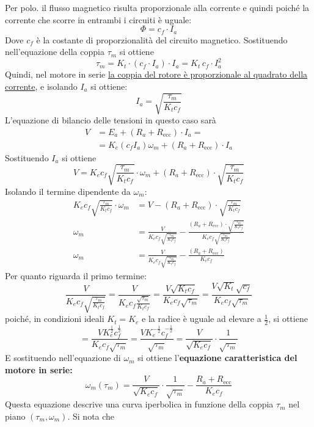﻿\documentclass[11pt, a4paper]{article}
\begin{document}
Per polo. il flusso magnetico risulta proporzionale alla corrente e quindi poiché la corrente che scorre in entrambi i circuiti è uguale:
\[
    \Phi = c_f \cdot I_a
\]
Dove $c_f$ è la costante di proporzionalità del circuito magnetico. Sostituendo nell'equazione della coppia $\tau_{m}$ si ottiene
\[
    \tau_m = K_t \cdot (c_f \cdot I_a) \cdot I_a = K_t \, c_f \cdot I_a^2
\]
Quindi, nel motore in serie \underline{la coppia del rotore è proporzionale al quadrato della corrente}, e isolando $I_{a}$ si ottiene:
\[
    I_a = \sqrt{\frac{\tau_m}{K_t c_f}}
\]
L'equazione di bilancio delle tensioni in questo caso sarà
\begin{align*}
    V &= E_a + (R_a + R_{\text{ecc}}) \cdot I_a =\\
    &= K_e (c_f I_a) \omega_m + (R_a + R_{\text{ecc}}) \cdot I_a
\end{align*}
Sostituendo $I_a$ si ottiene
\[
    V = K_e c_f \sqrt{\frac{\tau_m}{K_t c_f}} \cdot \omega_m + (R_a + R_{\text{ecc}}) \cdot \sqrt{\frac{\tau_m}{K_t c_f}}
\]
Isolando il termine dipendente da $\omega_m$:
\begin{align*}
    K_e c_f \sqrt{\frac{\tau_m}{K_t c_f}} \cdot \omega_m &= V - (R_a + R_{\text{ecc}}) \cdot \sqrt{\frac{\tau_m}{K_t c_f}}\\
    \omega_m &= \frac{V}{K_e c_f \sqrt{\frac{\tau_m}{K_t c_f}}} - \frac{(R_a + R_{\text{ecc}}) \cdot \sqrt{\frac{\tau_m}{K_t c_f}}}{K_e c_f \sqrt{\frac{\tau_m}{K_t c_f}}}\\
    \omega_m &= \frac{V}{K_e c_f \sqrt{\frac{\tau_m}{K_t c_f}}} - \frac{(R_a + R_{\text{ecc}})}{K_e c_f}
\end{align*}
Per quanto riguarda il primo termine:
\[
    \frac{V}{K_e c_f \sqrt{\frac{\tau_m}{K_t c_f}}} = \frac{V}{K_e c_f \frac{\sqrt{\tau_m}}{K_t c_f}} = \frac{V \sqrt{K_t c_f}}{K_e c_f \sqrt{\tau_m}}  = \frac{V \sqrt{K_t} \sqrt{c_f}}{K_e c_f \sqrt{\tau_m}}
\]
poiché, in condizioni ideali $K_{t} = K_{e}$ e la radice è uguale ad elevare a $\frac{1}{2}$, si ottiene
\[
    = \frac{V K_{e}^{\frac{1}{2}} c_{f}^{\frac{1}{2}}}{K_e c_f \sqrt{\tau_m}} = \frac{V K_{e}^{-\frac{1}{2}} c_{f}^{-\frac{1}{2}}}{ \sqrt{\tau_m}} = \frac{V}{\sqrt{K_e c_f}} \cdot \frac{1}{\sqrt{\tau_m}}
\]
E sostituendo nell'equazione di $\omega_{m}$ si ottiene l'\textbf{equazione caratteristica del motore in serie:}
\[
    \omega_m(\tau_m) = \frac{V}{\sqrt{K_e c_f}} \cdot \frac{1}{\sqrt{\tau_m}} - \frac{R_a + R_{\text{ecc}}}{K_e c_f}
    \label{eq:caratteristica_serie}
\]
Questa equazione descrive una curva iperbolica in funzione della coppia $\tau_{m}$ nel piano $(\tau_m, \omega_m)$. Si nota che
\end{document}
